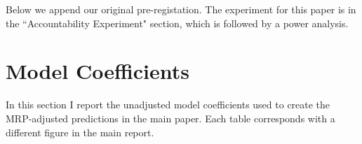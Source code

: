 \documentclass[12pt, letterpaper]{article}
\begin{document}
Below we append our original pre-registation. The experiment for this paper is in the ``Accountability Experiment" section, which is followed by a power analysis.





\section{Model Coefficients}

In this section I report the unadjusted model coefficients used to create the MRP-adjusted predictions in the main paper. Each table corresponds with a different figure in the main report.









\end{document}
